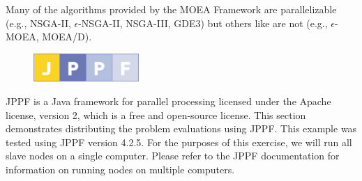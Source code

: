 Many of the algorithms provided by the MOEA Framework are parallelizable (e.g., NSGA-II, $\epsilon$-NSGA-II, NSGA-III, GDE3) but others like are not (e.g., $\epsilon$-MOEA, MOEA/D).

\begin{figure}
  \includegraphics[width=4cm]{jppf.png}
\end{figure}
JPPF is a Java framework for parallel processing licensed under the Apache license, version 2, which is a free and open-source license.  This section demonstrates distributing the problem evaluations using JPPF.  This example was tested using JPPF version 4.2.5.  For the purposes of this exercise, we will run all slave nodes on a single computer.  Please refer to the JPPF documentation for information on running nodes on multiple computers.

